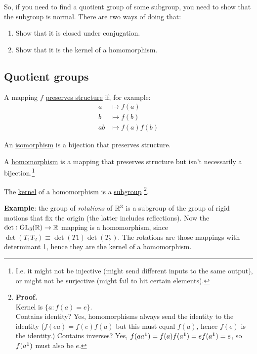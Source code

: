 So, if you need to find a quotient group of some subgroup, you need to show
that the subgroup is normal. There are two ways of doing that:

\begin{enumerate}
\item Show that it is closed under conjugation.
\item Show that it is the kernel of a homomorphism.
\end{enumerate}

\newpage
\subsection{Quotient groups}

A mapping $f$ \underline{preserves structure} if, for example:
\begin{align*}
  a  & \mapsto f(a)\\
  b  & \mapsto f(b)\\
  ab & \mapsto f(a)f(b)
\end{align*}

An \underline{isomorphism} is a bijection that preserves structure.

A \underline{homomorphism} is a mapping that preserves structure but isn't
necessarily a bijection.\footnote{I.e. it might not be injective (might send
  different inputs to the same output), or might not be surjective (might fail
  to hit certain elements).}

\begin{theorem}
The \underline{kernel} of a homomorphism is a \underline{subgroup} \footnote{\textbf{Proof.}\\Kernel
  is $\{a:f(a) = e\}$.\\
Contains identity? Yes, homomorphisms always send the identity to the identity
($f(ea) = f(e)f(a)$ but this must equal $f(a)$, hence $f(e)$ is the identity.)
Contains inverses? Yes, $f(aa^{\mathbf 1}) = f(a)f(a^{\mathbf 1}) = ef(a^{\mathbf 1}) = e$, so $f(a^{\mathbf 1})$ must also be $e$.}.
\end{theorem}

\textbf{Example}: the group of \emph{rotations} of $\mathbb{R}^3$ is a subgroup of the
group of rigid motions that fix the origin (the latter includes
reflections). Now the $\det:\mathrm{GL}_{3}(\mathbb{R}) \to \mathbb{R}$ mapping is a homomorphism, since
$\det(T_1T_2) \equiv \det(T1)\det(T_2)$. The rotations are those mappings with
determinant 1, hence they are the kernel of a homomorphism.

